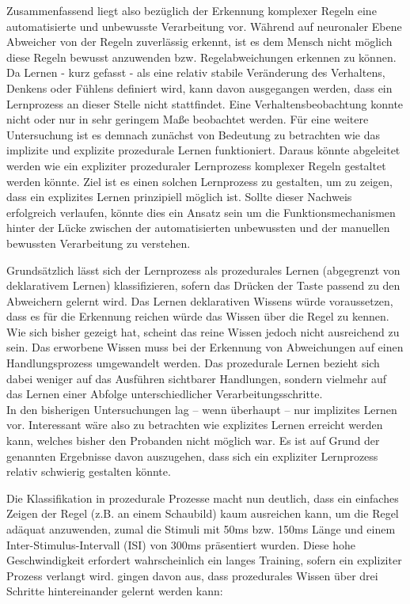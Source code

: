 \documentclass[doc,a4paper,12pt]{apa6}
\begin{document}
Zusammenfassend liegt also bezüglich der Erkennung komplexer Regeln eine automatisierte und unbewusste Verarbeitung vor. Während auf neuronaler Ebene Abweicher von der Regeln zuverlässig erkennt, ist es dem Mensch nicht möglich diese Regeln bewusst anzuwenden bzw. Regelabweichungen erkennen zu können. Da Lernen - kurz gefasst - als eine relativ stabile Veränderung des Verhaltens, Denkens oder Fühlens definiert wird, kann davon ausgegangen werden, dass ein Lernprozess an dieser Stelle nicht stattfindet. Eine Verhaltensbeobachtung konnte nicht oder nur in sehr geringem Maße beobachtet werden. Für eine weitere Untersuchung ist es demnach zunächst von Bedeutung zu betrachten wie das implizite und explizite prozedurale Lernen funktioniert. Daraus könnte abgeleitet werden wie ein expliziter prozeduraler Lernprozess komplexer Regeln gestaltet werden könnte. Ziel ist es einen solchen Lernprozess zu gestalten, um zu zeigen, dass ein explizites Lernen prinzipiell möglich ist. Sollte dieser Nachweis erfolgreich verlaufen, könnte dies ein Ansatz sein um die Funktionsmechanismen hinter der Lücke zwischen der automatisierten unbewussten und der manuellen bewussten Verarbeitung zu verstehen.


Grundsätzlich lässt sich der Lernprozess als prozedurales Lernen (abgegrenzt von deklarativem Lernen) klassifizieren, sofern das Drücken der Taste passend zu den Abweichern gelernt wird. Das Lernen deklarativen Wissens würde voraussetzen, dass es für die Erkennung reichen würde das Wissen über die Regel zu kennen. Wie sich bisher gezeigt hat, scheint das reine Wissen jedoch nicht ausreichend zu sein. Das erworbene Wissen muss bei der Erkennung von Abweichungen auf einen Handlungsprozess umgewandelt werden. Das prozedurale Lernen bezieht sich dabei weniger auf das Ausführen sichtbarer Handlungen, sondern vielmehr auf das Lernen einer Abfolge unterschiedlicher Verarbeitungsschritte.\\
In den bisherigen Untersuchungen lag – wenn überhaupt – nur implizites Lernen vor. Interessant wäre also zu betrachten wie explizites Lernen erreicht werden kann, welches bisher den Probanden nicht möglich war. Es ist auf Grund der genannten Ergebnisse davon auszugehen, dass sich ein expliziter Lernprozess relativ schwierig gestalten könnte.

Die Klassifikation in prozedurale Prozesse macht nun deutlich, dass ein einfaches Zeigen der Regel (z.B. an einem Schaubild) kaum ausreichen kann, um die Regel adäquat anzuwenden, zumal die Stimuli mit 50ms bzw. 150ms Länge und einem Inter-Stimulus-Intervall (ISI) von 300ms präsentiert wurden. Diese hohe Geschwindigkeit erfordert wahrscheinlich ein langes Training, sofern ein expliziter Prozess verlangt wird. \textcite{fitts1967human} gingen davon aus, dass prozedurales Wissen über drei Schritte hintereinander gelernt werden kann:
\end{document}
